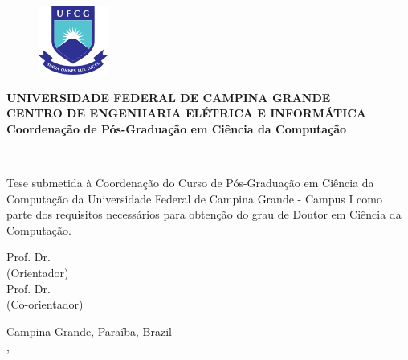 \begin{figure}[H]
\centering
\includegraphics[height=85px]{images/logo_ufcg.png}
\end{figure}

\begin{center}
\textbf{UNIVERSIDADE FEDERAL DE CAMPINA GRANDE} \\
\textbf{CENTRO DE ENGENHARIA ELÉTRICA E INFORMÁTICA} \\
\textbf{Coordenação de Pós-Graduação em Ciência da Computação}
\vspace{3em}

\Large{}
\thetitle
\vspace{3em}

\Large{\theauthor}\\
\vspace{2em}

\normalsize{\parbox[t]{122mm}{Tese submetida à Coordenação do Curso de Pós-Graduação em Ciência da Computação da Universidade Federal de Campina Grande - Campus I como parte dos requisitos necessários para obtenção do grau de Doutor em Ciência da Computação.}}
\vspace{6em}


Prof. Dr. \profa\\
(Orientador) \\
\vspace{1em}
Prof. Dr. \profb\\
(Co-orientador)
\vfill

Campina Grande, Paraíba, Brazil \\
\MONTH, \the\year
\end{center}